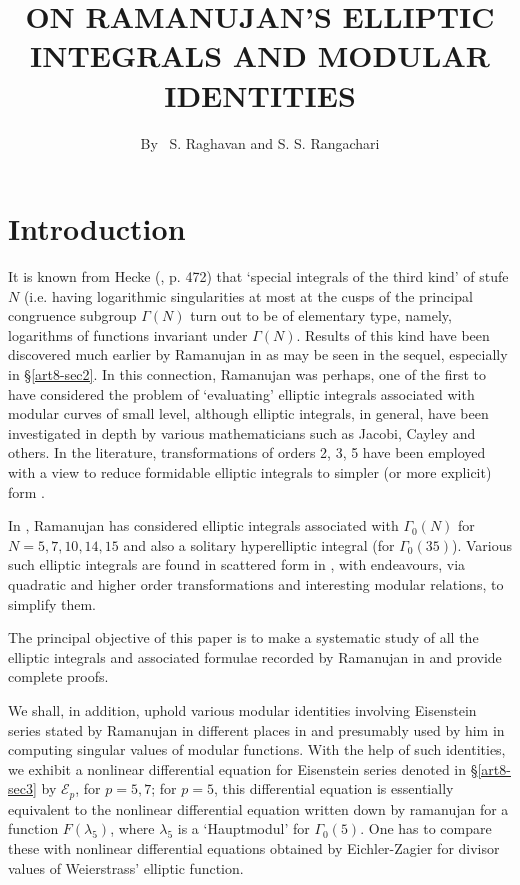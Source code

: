 \title{ON RAMANUJAN'S ELLIPTIC INTEGRALS AND MODULAR IDENTITIES}

\author{By~ S. Raghavan and S. S. Rangachari}

\date{}
\maketitle

\setcounter{pageoriginal}{118}
\section*{Introduction}\pageoriginale
It is known from Hecke (\cite{art8-key5}, p. 472) that `special integrals of the third kind' of stufe $N$ (i.e. having logarithmic singularities at most at the cusps of the principal congruence subgroup $\Gamma(N)$ turn out to be of elementary type, namely, logarithms of functions invariant under $\Gamma(N)$. Results of this kind have been discovered much earlier by Ramanujan in \cite{art8-key11} as may be seen in the sequel, especially in \S\ref{art8-sec2}. In this connection, Ramanujan was perhaps, one of the first to have considered the problem of `evaluating' elliptic integrals associated with modular curves of small level, although elliptic integrals, in general, have been investigated in depth by various mathematicians such as Jacobi, Cayley and others. In the literature, transformations of orders 2, 3, 5 have been employed with a view to reduce formidable elliptic integrals to simpler (or more explicit) form \cite{art8-key4}.

In \cite{art8-key11}, Ramanujan has considered elliptic integrals associated with $\Gamma_{0}(N)$ for $N=5,7,10,14,15$ and also a solitary hyperelliptic integral (for $\Gamma_{0}(35)$). Various such elliptic integrals are found in scattered form in \cite{art8-key11}, with endeavours, via quadratic and higher order transformations and interesting modular relations, to simplify them.

The principal objective of this paper is to make a systematic study of all the elliptic integrals and associated formulae recorded by Ramanujan in \cite{art8-key11} and provide complete proofs.

We shall, in addition, uphold various modular identities involving Eisenstein series stated by Ramanujan in different places in \cite{art8-key11} and presumably used by him in computing singular values of modular functions. With the help of such identities, we exhibit a nonlinear differential equation for Eisenstein series denoted in \S\ref{art8-sec3} by $\mathscr{E}_{p}$, for $p=5,7$; for $p=5$, this differential equation is essentially equivalent to the nonlinear differential equation written down by ramanujan \cite{art8-key11} for a function $F(\lambda_{5})$, where $\lambda_{5}$ is a `Hauptmodul' for $\Gamma_{0}(5)$. One has to compare these with nonlinear differential equations obtained by Eichler-Zagier \cite{art8-key2} for divisor values of Weierstrass' elliptic function.


